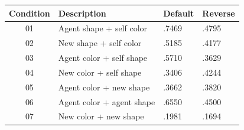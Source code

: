 \documentclass{article}
\begin{document}
\begin{table}[h!]
\centering
\begin{tabular}{c|l|l|l}
Condition & Description               & Default & Reverse \\
\hline
01        & Agent shape + self color  & .7469   & .4795   \\
02        & New shape + self color    & .5185   & .4177   \\
03        & Agent color + self shape  & .5710   & .3629   \\
04        & New color + self shape    & .3406   & .4244   \\
05        & Agent color + new shape   & .3662   & .3820   \\
06        & Agent color + agent shape & .6550   & .4500   \\
07        & New color + new shape     & .1981   & .1694  
\end{tabular}
\end{table}
\end{document}
